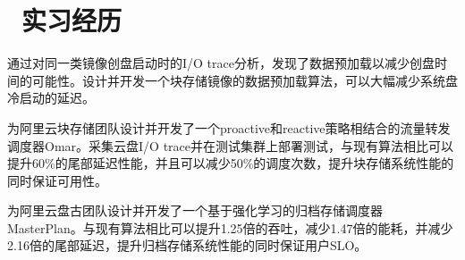 \documentclass{resume}
\begin{document}
\section{\faUsers\ 实习经历}
通过对同一类镜像创盘启动时的I/O trace分析，发现了数据预加载以减少创盘时间的可能性。设计并开发一个块存储镜像的数据预加载算法，可以大幅减少系统盘冷启动的延迟。

为阿里云块存储团队设计并开发了一个proactive和reactive策略相结合的流量转发调度器Omar。采集云盘I/O trace并在测试集群上部署测试，与现有算法相比可以提升60\%的尾部延迟性能，并且可以减少50\%的调度次数，提升块存储系统性能的同时保证可用性。

为阿里云盘古团队设计并开发了一个基于强化学习的归档存储调度器MasterPlan。与现有算法相比可以提升1.25倍的吞吐，减少1.47倍的能耗，并减少2.16倍的尾部延迟，提升归档存储系统性能的同时保证用户SLO。

\end{document}
